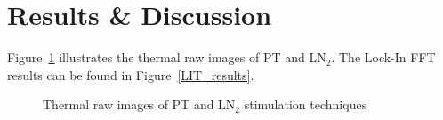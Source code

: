 

\section{Results \& Discussion} %
\label{sec:results_&_discussion}
Figure~\ref{raw_results} illustrates the thermal raw images of PT and LN$_2$. The Lock-In FFT results can be found in Figure~\ref{LIT_results}.



\begin{figure}[htpb]
   \centering
   \hspace{10pt}
   \hspace{10pt}
   \caption{Thermal raw images of PT and LN$_2$ stimulation techniques}      
   \label{raw_results}
\end{figure}


